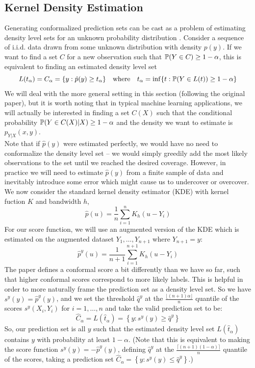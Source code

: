 \documentclass[a4paper, 12pt]{article}
\begin{document}
\subsection*{Kernel Density Estimation}
Generating conformalized prediction sets can be cast as a problem of estimating
density level sets for an unknown probability distribution \autocite{leiDistributionFreePrediction2013}.
Consider a sequence of i.i.d. data drawn from some unknown distribution with density $p(y)$.
If we want to find a set $C$ for a new observation such that
$\P(Y \in C) \geq 1 - \alpha$, this is equivalent to finding an estimated density level set
$$L(t_\alpha)=C_\alpha=\{y: \hat{p}(y) \geq t_\alpha\} \quad \text{where} \quad t_\alpha = \inf \{t: \P(Y \in L(t)) \geq 1 - \alpha\}$$
We will deal with the more general setting in this section (following the original paper), but it is worth noting that in typical machine learning applications, we will actually be interested in finding a set $C(X)$ such that the
conditional probability $\P(Y \in C(X) | X) \geq 1 - \alpha$ and the density we want to estimate is $p_{Y|X}(x, y)$.\\
Note that if $\hat{p}(y)$ were estimated perfectly, we would have no need to conformalize the density level set --
we would simply greedily add the most likely observations to the set until we reached the desired coverage.
However, in practice we will need to estimate $\hat{p}(y)$ from a finite sample
of data and inevitably introduce some error which might cause us to undercover or overcover. \\
We now consider the standard kernel density estimator (KDE) with kernel fuction $K$ and bandwidth $h$, \\
\[\hat{p}(u) = \frac{1}{n} \sum_{i=1}^n K_h(u-Y_i) \]
For our score function, we will use an augmented version of the KDE which is estimated on the augmented dataset $Y_1, \ldots, Y_{n+1}$ where $Y_{n+1}= y$:
\[ \hat{p}^y(u) = \frac{1}{n+1} \sum_{i=1}^{n+1} K_h(u-Y_i) \]
The paper defines a conformal score a bit differently than we have so far, such that higher conformal scores correspond to more likely labels. This is helpful in order to more naturally frame the prediction set as a density level set. So we have $s^y(y) = \hat{p}^y(y)$, and we set the threshold $\hat{q}^y$ at the $ \frac{\lfloor (n+1)\alpha \rfloor }{n}$ quantile of the scores $s^y(X_i, Y_i)$ for $i = 1, \ldots, n$ and take the valid prediction set to be:
\[ \hat{C}_\alpha = L(\hat{t}_\alpha) = \left\{ y: s^y(y) \geq \hat{q}^y \right\} \]
So, our prediction set is all $y$ such that the estimated density level set $L(\hat{t}_\alpha)$ contains $y$ with probability at least $1-\alpha$. (Note that this is equivalent to making the score function $s^y(y)=-\hat{p}^y(y)$, defining $\hat{q}^y$ at the $ \frac{\lceil (n+1)(1-\alpha) \rceil }{n}$ quantile of the scores, taking a prediction set $\hat{C}_\alpha = \left\{ y : s^y(y)\leq \hat{q}^y \right\}$.)  \\
\end{document}

